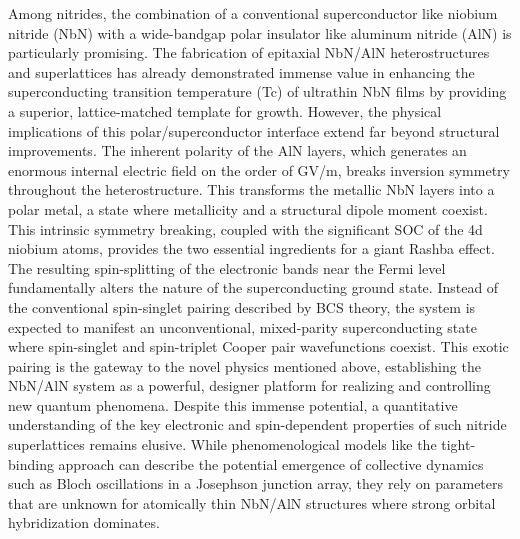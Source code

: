 \documentclass[aps,prl,reprint,superscriptaddress]{revtex4-2}
\begin{document}
Among
nitrides, the combination of a conventional superconductor like niobium nitride
(NbN) with a wide-bandgap polar insulator like aluminum nitride (AlN) is
particularly promising. The fabrication of epitaxial NbN/AlN heterostructures
and superlattices has already demonstrated immense value in enhancing the
superconducting transition temperature (Tc) of ultrathin NbN films by providing
a superior, lattice-matched template for growth. However, the physical
implications of this polar/superconductor interface extend far beyond
structural improvements. The inherent polarity of the AlN layers, which
generates an enormous internal electric field on the order of GV/m, breaks
inversion symmetry throughout the heterostructure. This transforms the metallic
NbN layers into a polar metal, a state where metallicity and a structural
dipole moment coexist.  This intrinsic symmetry breaking, coupled with the
significant SOC of the 4d niobium atoms, provides the two essential ingredients
for a giant Rashba effect. The resulting spin-splitting of the electronic bands
near the Fermi level fundamentally alters the nature of the superconducting
ground state. Instead of the conventional spin-singlet pairing described by BCS
theory, the system is expected to manifest an unconventional, mixed-parity
superconducting state where spin-singlet and spin-triplet Cooper pair
wavefunctions coexist. This exotic pairing is the gateway to the novel physics
mentioned above, establishing the NbN/AlN system as a powerful, designer
platform for realizing and controlling new quantum phenomena.  Despite this
immense potential, a quantitative understanding of the key electronic and
spin-dependent properties of such nitride superlattices remains elusive. While
phenomenological models like the tight-binding approach can describe the
potential emergence of collective dynamics such as Bloch oscillations in a
Josephson junction array, they rely on parameters that are unknown for
atomically thin NbN/AlN structures where strong orbital hybridization
dominates. 
\end{document}
